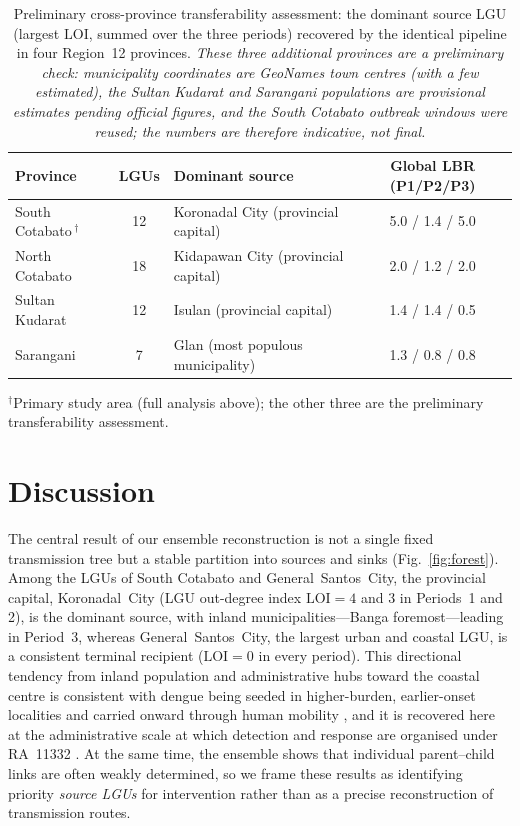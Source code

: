 \documentclass[a4paper,11pt]{article}
\begin{document}
\begin{table}[htbp]
\centering
\caption{Preliminary cross-province transferability assessment: the dominant source LGU (largest
$\mathrm{LOI}$, summed over the three periods) recovered by the identical pipeline in four
Region~12 provinces. \emph{These three additional provinces are a preliminary check:
municipality coordinates are GeoNames town centres (with a few estimated), the
Sultan Kudarat and Sarangani populations are provisional estimates pending official
figures, and the South Cotabato outbreak windows were reused; the numbers are
therefore indicative, not final.}}
\label{tab:crossprov}
\small
\begin{tabular}{lclc}
\toprule
\textbf{Province} & \textbf{LGUs} & \textbf{Dominant source} & \textbf{Global LBR (P1/P2/P3)} \\
\midrule
South Cotabato\,$^{\dagger}$ & 12 & Koronadal City (provincial capital) & 5.0 / 1.4 / 5.0 \\
North Cotabato & 18 & Kidapawan City (provincial capital) & 2.0 / 1.2 / 2.0 \\
Sultan Kudarat & 12 & Isulan (provincial capital) & 1.4 / 1.4 / 0.5 \\
Sarangani & 7 & Glan (most populous municipality) & 1.3 / 0.8 / 0.8 \\
\bottomrule
\end{tabular}

\smallskip
\noindent\small $^{\dagger}$Primary study area (full analysis above); the other
three are the preliminary transferability assessment.
\end{table}

\section{Discussion}
The central result of our ensemble reconstruction is not a single fixed transmission
tree but a stable partition into sources and sinks (Fig.~\ref{fig:forest}). Among the
LGUs of South Cotabato and General~Santos~City, the provincial capital, Koronadal~City
(LGU out-degree index $\mathrm{LOI}=4$ and $3$ in Periods~1 and 2), is the dominant
source, with inland municipalities---Banga foremost---leading in Period~3, whereas
General~Santos~City, the largest urban and coastal LGU, is a consistent terminal
recipient ($\mathrm{LOI}=0$ in every period). This directional
tendency from inland population and administrative hubs toward the coastal centre
is consistent with dengue being seeded in higher-burden, earlier-onset localities and
carried onward through human mobility \cite{Stoddard2009,Wesolowski2015}, and it
is recovered here at the administrative scale at which detection and response are
organised under RA~11332 \cite{RA11332,DOH2020IRR}. At the same time, the ensemble
shows that individual parent--child links are often weakly determined, so we frame
these results as identifying priority \emph{source LGUs} for intervention rather
than as a precise reconstruction of transmission routes.
\end{document}
